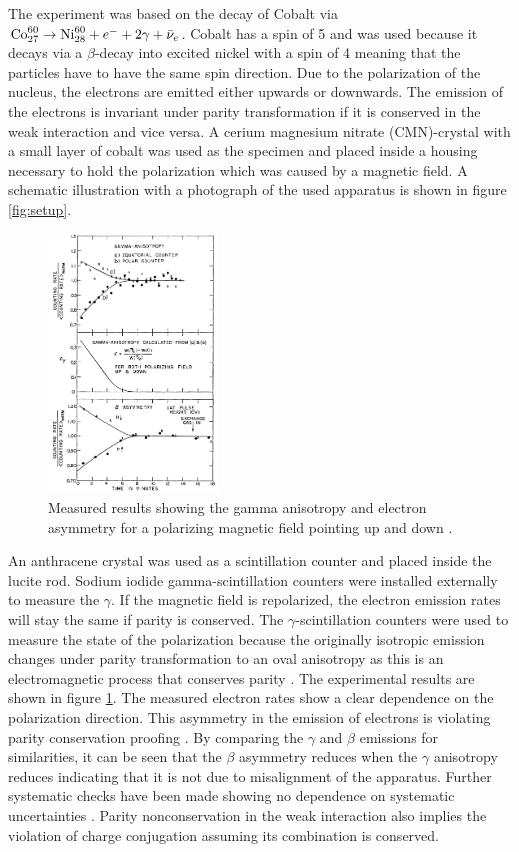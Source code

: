 The experiment was based on the decay of Cobalt via $\text{Co}^{60}_{27}\rightarrow \text{Ni}^{60}_{28}+e^-+2\gamma+\bar\nu_e$.
Cobalt has a spin of 5 and was used because it decays via a $\beta$-decay into excited nickel with a spin of 4 meaning that the particles have to have the same spin direction.
Due to the polarization of the nucleus, the electrons are emitted either upwards or downwards.
The emission of the electrons is invariant under parity transformation if it is conserved in the weak interaction and vice versa.
A cerium magnesium nitrate (CMN)-crystal with a small layer of cobalt was used as the specimen and placed inside a housing necessary to hold the polarization \cite{CaseStudies} which was caused by a magnetic field.
A schematic illustration with a photograph of the used apparatus is shown in figure \ref{fig:setup}.
\begin{figure}
    \centering
    \includegraphics[width=0.4\textwidth]{figs/resultsWu.png}
    \caption{Measured results showing the gamma anisotropy and electron asymmetry for a polarizing magnetic field pointing up and down \cite{PhysRev.105.1413}.}
    \label{fig:resultsWu}
\end{figure}
An anthracene crystal was used as a scintillation counter and placed inside the lucite rod.
Sodium iodide gamma-scintillation counters were installed externally to measure the $\gamma$.
If the magnetic field is repolarized, the electron emission rates will stay the same if parity is conserved.
The $\gamma$-scintillation counters were used to measure the state of the polarization because the originally isotropic emission changes under parity transformation to an oval anisotropy as this is an electromagnetic process that conserves parity \cite{CaseStudies}.
The experimental results are shown in figure \ref{fig:resultsWu}.
The measured electron rates show a clear dependence on the polarization direction.
This asymmetry in the emission of electrons is violating parity conservation proofing \cite{PhysRev.105.1413}.
By comparing the $\gamma$ and $\beta$ emissions for similarities, it can be seen that the $\beta$ asymmetry reduces when the $\gamma$ anisotropy reduces indicating that it is not due to misalignment of the apparatus.
Further systematic checks have been made showing no dependence on systematic uncertainties \cite{CaseStudies}.
Parity nonconservation in the weak interaction also implies the violation of charge conjugation assuming its combination is conserved.

